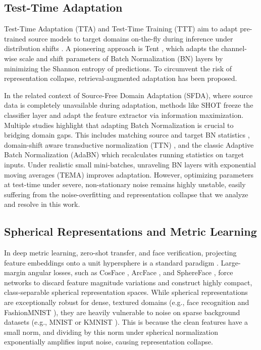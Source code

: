 \documentclass{article}
\theoremstyle{plain}
\theoremstyle{definition}
\theoremstyle{remark}
\begin{document}
\subsection{Test-Time Adaptation}
Test-Time Adaptation (TTA) and Test-Time Training (TTT) aim to adapt pre-trained source models to target domains on-the-fly during inference under distribution shifts \cite{sun2020test, sun2020ttt, xiao2024survey}. A pioneering approach is Tent \cite{wang2021tent}, which adapts the channel-wise scale and shift parameters of Batch Normalization (BN) layers by minimizing the Shannon entropy of predictions. To circumvent the risk of representation collapse, retrieval-augmented adaptation \cite{zancato2023t3ar} has been proposed.

In the related context of Source-Free Domain Adaptation (SFDA), where source data is completely unavailable during adaptation, methods like SHOT \cite{liang2020shot} freeze the classifier layer and adapt the feature extractor via information maximization. Multiple studies highlight that adapting Batch Normalization is crucial to bridging domain gaps. This includes matching source and target BN statistics \cite{ishii2021source}, domain-shift aware transductive normalization (TTN) \cite{lim2023ttn}, and the classic Adaptive Batch Normalization (AdaBN) \cite{li2018adabn} which recalculates running statistics on target inputs. Under realistic small mini-batches, unraveling BN layers with exponential moving averages (TEMA) \cite{yuan2023unraveling} improves adaptation. However, optimizing parameters at test-time under severe, non-stationary noise remains highly unstable, easily suffering from the noise-overfitting and representation collapse that we analyze and resolve in this work.

\subsection{Spherical Representations and Metric Learning}
In deep metric learning, zero-shot transfer, and face verification, projecting feature embeddings onto a unit hypersphere is a standard paradigm \cite{wang2018cosface, Deng_2019_CVPR, Liu_2017_CVPR}. Large-margin angular losses, such as CosFace \cite{wang2018cosface}, ArcFace \cite{Deng_2019_CVPR}, and SphereFace \cite{Liu_2017_CVPR}, force networks to discard feature magnitude variations and construct highly compact, class-separable spherical representation spaces. While spherical representations are exceptionally robust for dense, textured domains (e.g., face recognition and FashionMNIST \cite{xiao2017fashion}), they are heavily vulnerable to noise on sparse background datasets (e.g., MNIST \cite{lecun1998gradient} or KMNIST \cite{clanuwat2018deep}). This is because the clean features have a small norm, and dividing by this norm under spherical normalization exponentially amplifies input noise, causing representation collapse.
\end{document}
